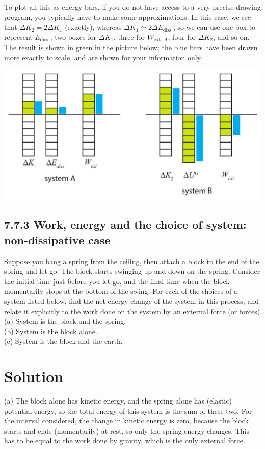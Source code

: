 \documentclass[10pt]{article}
\begin{document}
To plot all this as energy bars, if you do not have access to a very precise drawing program, you typically have to make some approximations. In this case, we see that $\Delta K_{2}=2 \Delta K_{1}$ (exactly), whereas $\Delta K_{1} \simeq 2 \Delta E_{\text {diss }}$, so we can use one box to represent $E_{\text {diss }}$, two boxes for $\Delta K_{1}$, three for $W_{\text {ext, } A}$, four for $\Delta K_{2}$, and so on. The result is shown in green in the picture below; the blue bars have been drawn more exactly to scale, and are shown for your information only.

\begin{center}
\includegraphics[max width=\textwidth]{2024_09_14_9969b06773f10b6936e8g-173}
\end{center}

\subsection*{7.7.3 Work, energy and the choice of system: non-dissipative case}
Suppose you hang a spring from the ceiling, then attach a block to the end of the spring and let go. The block starts swinging up and down on the spring. Consider the initial time just before you let go, and the final time when the block momentarily stops at the bottom of the swing. For each of the choices of a system listed below, find the net energy change of the system in this process, and relate it explicitly to the work done on the system by an external force (or forces)\\
(a) System is the block and the spring.\\
(b) System is the block alone.\\
(c) System is the block and the earth.

\section*{Solution}
(a) The block alone has kinetic energy, and the spring alone has (elastic) potential energy, so the total energy of this system is the sum of these two. For the interval considered, the change in kinetic energy is zero, because the block starts and ends (momentarily) at rest, so only the spring energy changes. This has to be equal to the work done by gravity, which is the only external force.
\end{document}
